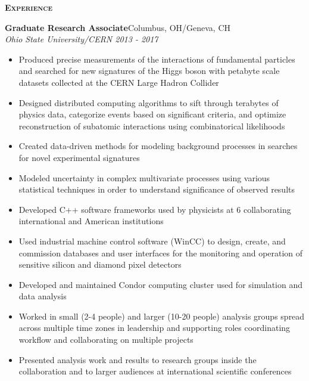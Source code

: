 \documentclass[line]{letter}
\begin{document}
{\vspace{3pt} \Large \textsc{\textbf{Experience}}}
\begin{addmargin}[1em]{1em}
{\large {\bf Graduate Research Associate}\hfill Columbus, OH/Geneva, CH\vspace{1mm}}\\
{\large \it Ohio State University/CERN \hfill  2013 - 2017} \\
\vspace{-6mm}
\begin{itemize}[leftmargin=5mm]
\item Produced precise measurements of the interactions of fundamental particles and searched for new signatures of the Higgs boson with petabyte scale datasets collected at the CERN Large Hadron Collider
\item Designed distributed computing algorithms to sift through terabytes of physics data, categorize events based on significant criteria, and optimize reconstruction of subatomic interactions using combinatorical likelihoods 
\item Created data-driven methods for modeling background processes in searches for novel experimental signatures 
\item Modeled uncertainty in complex multivariate processes using various statistical techniques in order to understand significance of observed results
\item Developed C++ software frameworks used by physicists at 6 collaborating international and American institutions
\item Used industrial machine control software (WinCC) to design, create, and commission databases and user interfaces for the monitoring and operation of sensitive silicon and diamond pixel detectors
\item Developed and maintained Condor computing cluster used for simulation and data analysis
\item Worked in small (2-4 people) and larger (10-20 people) analysis groups spread across multiple time zones in leadership and supporting roles coordinating workflow and collaborating on multiple projects
\item Presented analysis work and results to research groups inside the collaboration and to larger audiences at international scientific conferences
\end{itemize}


\end{addmargin}
\end{document}
